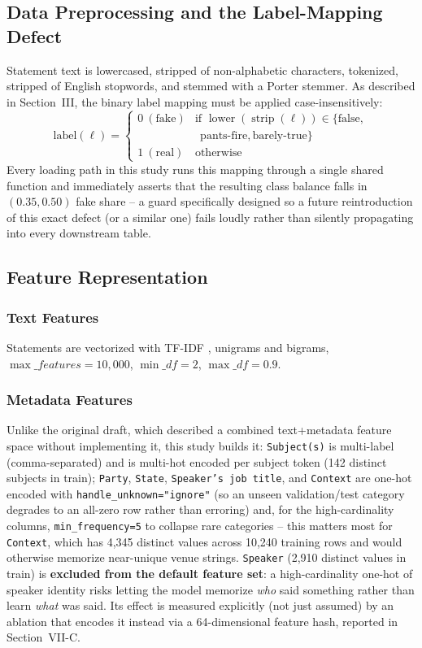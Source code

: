 \documentclass[conference]{IEEEtran}
\begin{document}
\subsection{Data Preprocessing and the Label-Mapping Defect}
Statement text is lowercased, stripped of non-alphabetic characters, tokenized,
stripped of English stopwords, and stemmed with a Porter stemmer. As described in
Section~III, the binary label mapping must be applied case-insensitively:
\begin{equation}
\text{label}(\ell) =
\begin{cases}
0 \ (\text{fake}) & \text{if } \operatorname{lower}(\operatorname{strip}(\ell)) \in \{\text{false}, \\
& \ \ \text{pants-fire}, \text{barely-true}\} \\
1 \ (\text{real}) & \text{otherwise}
\end{cases}
\end{equation}
Every loading path in this study runs this mapping through a single shared
function and immediately asserts that the resulting class balance falls in
$(0.35, 0.50)$ fake share -- a guard specifically designed so a future reintroduction
of this exact defect (or a similar one) fails loudly rather than silently
propagating into every downstream table.

\subsection{Feature Representation}
\subsubsection{Text Features} Statements are vectorized with TF-IDF
\cite{salton1988}, unigrams and bigrams, $\max\_features=10{,}000$, $\min\_df=2$,
$\max\_df=0.9$.

\subsubsection{Metadata Features} Unlike the original draft, which described a
combined text+metadata feature space without implementing it, this study builds it:
\texttt{Subject(s)} is multi-label (comma-separated) and is multi-hot encoded per
subject token (142 distinct subjects in train); \texttt{Party},
\texttt{State}, \texttt{Speaker's job title}, and \texttt{Context} are one-hot
encoded with \texttt{handle\_unknown="ignore"} (so an unseen validation/test
category degrades to an all-zero row rather than erroring) and, for the
high-cardinality columns, \texttt{min\_frequency=5} to collapse rare categories --
this matters most for \texttt{Context}, which has 4,345 distinct values across
10,240 training rows and would otherwise memorize near-unique venue strings.
\texttt{Speaker} (2,910 distinct values in train) is \textbf{excluded from the
default feature set}: a high-cardinality one-hot of speaker identity risks letting
the model memorize \emph{who} said something rather than learn \emph{what} was
said. Its effect is measured explicitly (not just assumed) by an ablation that
encodes it instead via a 64-dimensional feature hash, reported in
Section~VII-C.
\end{document}
